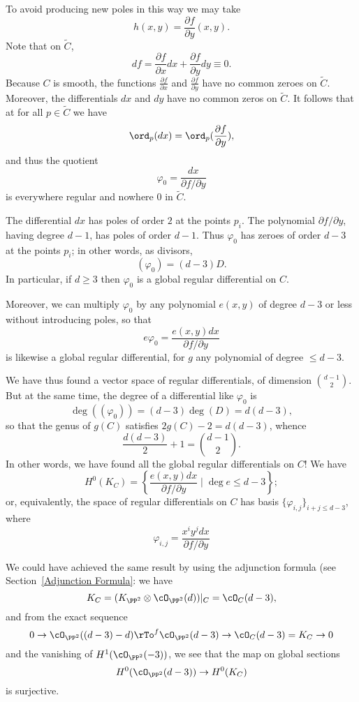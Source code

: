  To avoid producing new poles in this way we may take
 $$
 h(x,y) = \frac{\partial f}{\partial y}(x,y).
 $$
 Note that on $\widetilde C$,
 $$
 df = \frac{\partial f}{\partial x}dx + \frac{\partial f}{\partial y}dy \equiv 0.
 $$
Because $C$ is smooth, the functions $\frac{\partial f}{\partial x}$ and $\frac{\partial f}{\partial y}$ have no common zeroes on $\widetilde C$. Moreover, the differentials $dx$ and $dy$ have no common zeros on $\widetilde C$. It follows that at for all $p \in \widetilde C$ we  have
$$
\ord_p(dx) = \ord_p(\frac{\partial f}{\partial y}), 
$$ 
and thus the quotient 
$$
\varphi_0 = \frac{dx}{\partial f/\partial y}
$$
is everywhere regular and nowhere 0 in $\widetilde C$.

The differential $dx$ has poles of order $2$ at the points $p_i$. The polynomial $\partial f/\partial y$, having degree $d-1$, has poles of order $d-1$. Thus $\varphi_0$ has zeroes of order $d-3$ at the points $p_i$; in other words, as divisors,
$$
(\varphi_0) = (d-3)D.
$$
In particular, if $d \geq 3$ then $\varphi_0$ is a global regular differential on $C$.

Moreover, we can  multiply $\varphi_0$ by any polynomial $e(x,y)$ 
  of degree $d-3$ or less without introducing poles, so that 
$$
e\varphi_0 = \frac{e(x,y)dx}{\partial f/\partial y}
$$ 
is likewise a global regular differential, for $g$  any polynomial of degree $\leq d-3$.

We have thus found a vector space of regular differentials, of dimension $\binom{d-1}{2}$. But at the same time, the degree of a differential like $\varphi_0$ is
$$
\deg((\varphi_0)) = (d-3)\deg(D) = d(d-3),
$$
so that the genus of $g(C)$ satisfies
$2g(C)-2 = d(d-3)$, whence
$$
\frac{d(d-3)}{2} + 1 = \binom{d-1}{2}.
$$
In other words, we have found all the global regular differentials on $C$! We have
$$
H^0(K_C) = \left\{ \frac{e(x,y)dx}{\partial f/\partial y} \mid \deg e \leq d-3\right\};
$$
or, equivalently, the space of regular differentials on $C$ has basis $\{\varphi_{i,j} \}_{i+j \leq d-3}$, where
$$
\varphi_{i,j} =  \frac{x^iy^jdx}{\partial f/\partial y}
$$

We could have achieved the same result by using the adjunction formula (see Section~\ref{Adjunction Formula}: we have
$$
K_C = (K_{\PP^2} \otimes \cO_{\PP^2}(d))|_C = \cO_C(d-3),
$$
and from the exact sequence
$$
0 \to \cO_{\PP^2}((d-3)-d) \rTo^f \cO_{\PP^2}(d-3) \to \cO_C(d-3)=K_C \to 0
$$
and the vanishing of $H^1(\cO_{\PP^2}(-3))$, we see that the map on global sections
$$
H^0(\cO_{\PP^2}(d-3)) \to H^0(K_C)
$$
is surjective. 


